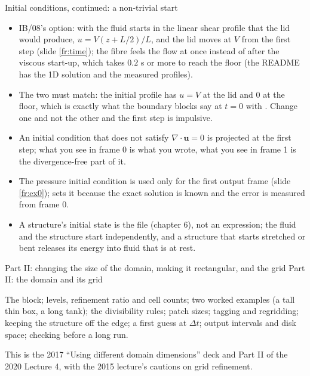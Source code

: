 \documentclass[aspectratio=169,11pt]{beamer}
\begin{document}
\begin{frame}{Initial conditions, continued: a non-trivial start}
\label{fr:ic2}
\small
\begin{itemize}
  \item IB/08's option: with  the fluid starts in the linear shear profile that the lid would produce, $u = V(z + L/2)/L$, and the lid moves at $V$ from the first step (slide \ref{fr:time}); the fibre feels the flow at once instead of after the viscous start-up, which takes $0.2$ s or more to reach the floor (the README has the 1D solution and the measured profiles).
  \item The two must match: the initial profile has $u = V$ at the lid and $0$ at the floor, which is exactly what the boundary blocks say at $t = 0$ with . Change one and not the other and the first step is impulsive.
  \item An initial condition that does not satisfy $\nabla\cdot\mathbf{u} = 0$ is projected at the first step; what you see in frame 0 is what you wrote, what you see in frame 1 is the divergence-free part of it.
  \item The pressure initial condition is used only for the first output frame (slide \ref{fr:ex0});  sets it because the exact solution is known and the error is measured from frame 0.
  \item A structure's initial state is the  file (chapter 6), not an expression; the fluid and the structure start independently, and a structure that starts stretched or bent releases its energy into fluid that is at rest.
\end{itemize}
\end{frame}

\begin{frame}{Part II: changing the size of the domain, making it rectangular, and the grid}
\label{fr:part2}
\Large\color{NavyBlue} Part II: the domain and its grid\par
\vspace{3mm}
\normalsize\color{black}
The  block; levels, refinement ratio and cell counts; two worked examples (a tall thin box, a long tank); the divisibility rules; patch sizes; tagging and regridding; keeping the structure off the edge; a first guess at $\Delta t$; output intervals and disk space; checking before a long run.
\vspace{3mm}

\small This is the 2017 ``Using different domain dimensions'' deck and Part II of the 2020 Lecture 4, with the 2015 lecture's cautions on grid refinement.
\end{frame}
\end{document}
